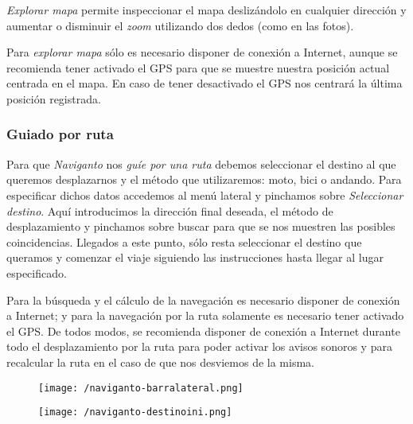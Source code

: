 \emph{Explorar mapa} permite inspeccionar el mapa deslizándolo en cualquier dirección y aumentar o
disminuir el \emph{zoom} utilizando dos dedos (como en las fotos).

Para \emph{explorar mapa} sólo es necesario disponer de conexión a Internet, aunque se recomienda
tener activado el \acs{GPS} para que se muestre nuestra posición actual centrada en el mapa. En caso
de tener desactivado el \acs{GPS} nos centrará la última posición registrada.

\subsubsection{Guiado por ruta}

Para que \emph{Naviganto} nos \emph{guíe por una ruta} debemos seleccionar el destino al que
queremos desplazarnos y el método que utilizaremos: moto, bici o andando. Para especificar dichos
datos accedemos al menú lateral y pinchamos sobre \emph{Seleccionar destino}. Aquí introducimos la
dirección final deseada, el método de desplazamiento y pinchamos sobre buscar para que se nos
muestren las posibles coincidencias. Llegados a este punto, sólo resta seleccionar el destino que
queramos y comenzar el viaje siguiendo las instrucciones hasta llegar al lugar especificado.

Para la búsqueda y el cálculo de la navegación es necesario disponer de conexión a Internet; y para
la navegación por la ruta solamente es necesario tener activado el \acs{GPS}. De todos modos, se
recomienda disponer de conexión a Internet durante todo el desplazamiento por la ruta para poder
activar los avisos sonoros y para recalcular la ruta en el caso de que nos desviemos de la misma.

\begin{figure}[h]
  \begin{minipage}[b]{0.5\linewidth}
    \begin{center}
      \texttt{[image: /naviganto-barralateral.png]}
    \end{center}
  \end{minipage}
  \begin{minipage}[b]{0.5\linewidth}
    \begin{center}
      \texttt{[image: /naviganto-destinoini.png]}
    \end{center}
  \end{minipage}
\end{figure}


